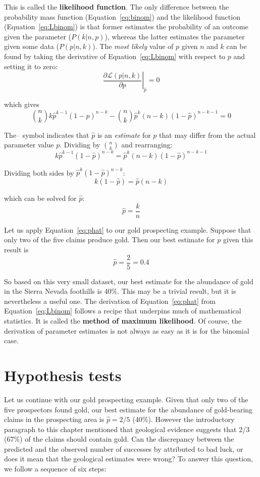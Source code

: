 This is called the \textbf{likelihood function}. The only difference
between the probability mass function (Equation~\ref{eq:binom}) and
the likelihood function (Equation~\ref{eq:Lbinom}) is that former
estimates the probability of an outcome given the parameter
($P(k|n,p)$), whereas the latter estimates the parameter given some
data ($P(p|n,k)$). The \emph{most likely} value of $p$ given $n$ and
$k$ can be found by taking the derivative of Equation~\ref{eq:Lbinom}
with respect to $p$ and setting it to zero:
\[
\left.\frac{\partial{\mathcal{L}(p|n,k)}}{\partial{p}}\right|_{\hat{p}} = 0
\]

\noindent which gives
\[
\binom{n}{k} k \hat{p}^{k-1} (1-\hat{p})^{n-k} -
\binom{n}{k} \hat{p}^k (n-k) (1-\hat{p})^{n-k-1} = 0
\]

The $\hat{~}$ symbol indicates that $\hat{p}$ is an \emph{estimate}
for $p$ that may differ from the actual parameter value $p$. Dividing
by $\binom{n}{k}$ and rearranging:
\[
  k \hat{p}^{k-1} (1-\hat{p})^{n-k} = \hat{p}^k (n-k) (1-\hat{p})^{n-k-1}
\]

Dividing both sides by $\hat{p}^k (1-\hat{p})^{n-k}$:
\[
k (1-\hat{p}) = \hat{p} (n-k)
\]

\noindent which can be solved for $\hat{p}$:
\begin{equation}
  \hat{p} = \frac{k}{n}
  \label{eq:phat}
\end{equation}

Let us apply Equation~\ref{eq:phat} to our gold prospecting example.
Suppose that only two of the five claims produce gold. Then our best
estimate for $p$ given this result is
\[
\hat{p} = \frac{2}{5} = 0.4
\]

So based on this very small dataset, our best estimate for the
abundance of gold in the Sierra Nevada foothills is 40\%. This may be
a trivial result, but it is nevertheless a useful one. The derivation
of Equation~\ref{eq:phat} from Equation~\ref{eq:Lbinom} follows a
recipe that underpins much of mathematical statistics. It is called
the \textbf{method of maximum likelihood}. Of course, the derivation
of parameter estimates is not always as easy as it is for the binomial
case.

\section{Hypothesis tests}
\label{sec:binomH}

Let us continue with our gold prospecting example. Given that only two
of the five prospectors found gold, our best estimate for the
abundance of gold-bearing claims in the prospecting area is $\hat{p} =
2/5$ (40\%). However the introductory paragraph to this chapter
mentioned that geological evidence suggests that 2/3 (67\%) of the
claims should contain gold. Can the discrepancy between the predicted
and the observed number of successes by attributed to bad luck, or
does it mean that the geological estimates were wrong? To answer this
question, we follow a sequence of six steps:

